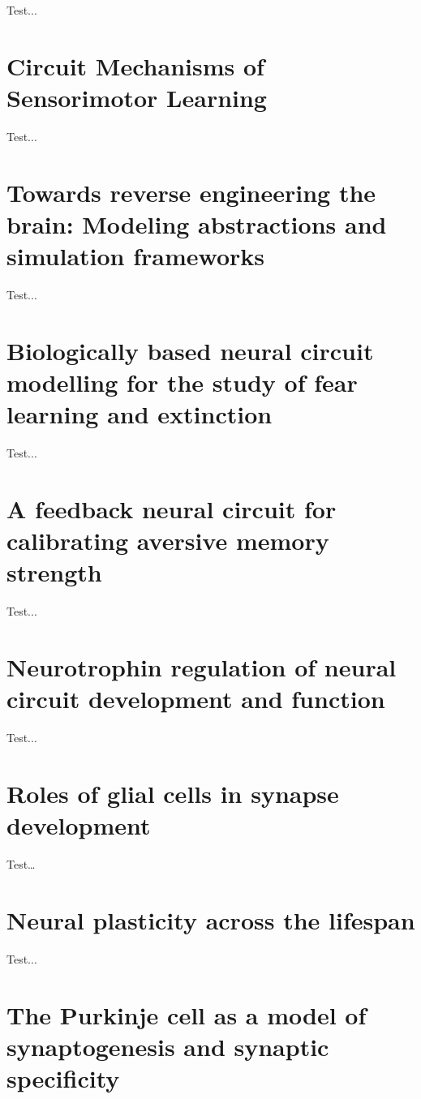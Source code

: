 \documentclass[11pt, a4paper, oneside]{article}   	%
\begin{document}
Test...

\section{Circuit Mechanisms of Sensorimotor Learning \cite{Makino2016}}

Test...

\section{Towards reverse engineering the brain: Modeling abstractions and simulation frameworks \cite{Nageswaran2010}}

Test...

\section{Biologically based neural circuit modelling for the study of fear learning and extinction \cite{Nair2016}}

Test...

\section{A feedback neural circuit for calibrating aversive memory strength \cite{Ozawa2016}}

Test...

\section{Neurotrophin regulation of neural circuit development and function \cite{Park2013}}

Test...

\section{Roles of glial cells in synapse development \cite{frieger2009}}

Test\ldots

\section{Neural plasticity across the lifespan \cite{Power2016}}

Test...

\section{The Purkinje cell as a model of synaptogenesis and synaptic specificity \cite{Sasso??-Pognetto2016}}
\end{document}
